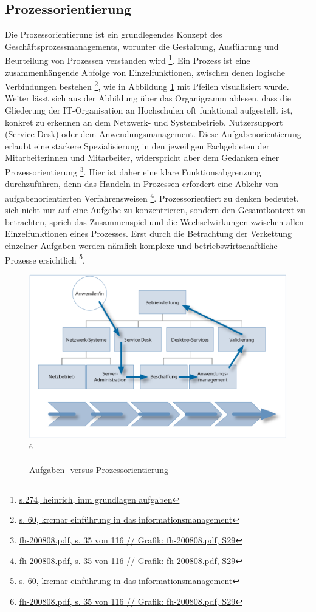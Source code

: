 \documentclass[a4paper, 12pt]{scrreprt}
\begin{document}
\subsection{Prozessorientierung}
Die Prozessorientierung ist ein grundlegendes Konzept des Geschäftsprozessmanagements, worunter die Gestaltung, Ausführung und Beurteilung von Prozessen verstanden wird \footnote{\url{s.274, heinrich, inm grundlagen aufgaben}}. Ein Prozess ist eine zusammenhängende Abfolge von Einzelfunktionen, zwischen denen logische Verbindungen bestehen \footnote{\url{s. 60, krcmar einführung in das informationsmanagement}}, wie in Abbildung \ref{avp} mit Pfeilen visualisiert wurde. Weiter lässt sich aus der Abbildung über das Organigramm ablesen, dass die Gliederung der IT-Organisation an Hochschulen oft funktional aufgestellt ist, konkret zu erkennen an dem Netzwerk- und Systembetrieb, Nutzersupport (Service-Desk) oder dem Anwendungsmanagement. Diese Aufgabenorientierung erlaubt eine stärkere Spezialisierung in den jeweiligen Fachgebieten der Mitarbeiterinnen und Mitarbeiter, widerspricht aber dem Gedanken einer Prozessorientierung \footnote{\url{fh-200808.pdf, s. 35 von 116 // Grafik: fh-200808.pdf, S29}}. Hier ist daher eine klare Funktionsabgrenzung durchzuführen, denn das Handeln in Prozessen erfordert eine Abkehr von aufgabenorientierten Verfahrensweisen \footnote{\url{fh-200808.pdf, s. 35 von 116 // Grafik: fh-200808.pdf, S29}}. Prozessorientiert zu denken bedeutet, sich nicht nur auf eine Aufgabe zu konzentrieren, sondern den Gesamtkontext zu betrachten, sprich das Zusammenspiel und die Wechselwirkungen zwischen allen Einzelfunktionen eines Prozesses. Erst durch die Betrachtung der Verkettung einzelner Aufgaben werden nämlich komplexe und betriebswirtschaftliche Prozesse ersichtlich \footnote{\url{s. 60, krcmar einführung in das informationsmanagement}}. 

\begin{figure}[h!]
	\centering
	\includegraphics[width=15cm]{bilder_olli/aufgaben-versus_prozessorientierung}  \footnote{\url{fh-200808.pdf, s. 35 von 116 // Grafik: fh-200808.pdf, S29}}
	\caption{Aufgaben- versus Prozessorientierung}
	\label{avp}
\end{figure}
\end{document}

